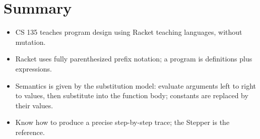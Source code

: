 \section{Summary}
\begin{itemize}
  \item CS 135 teaches program design using Racket teaching languages, without mutation.
  \item Racket uses fully parenthesized prefix notation; a program is definitions plus expressions.
  \item Semantics is given by the substitution model: evaluate arguments left to right to values, then substitute into the function body; constants are replaced by their values.
  \item Know how to produce a precise step-by-step trace; the Stepper is the reference.
\end{itemize}

